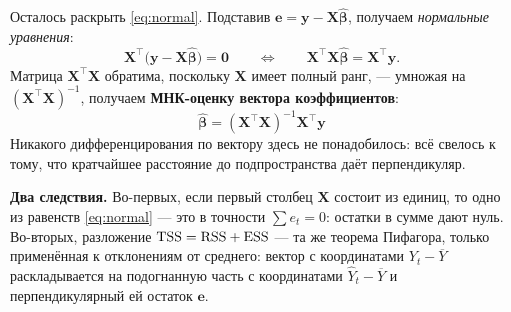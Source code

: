 Осталось раскрыть \eqref{eq:normal}. Подставив
$\mathbf{e} = \mathbf{y} - \mathbf{X}\widehat{\boldsymbol{\beta}}$, получаем
\emph{нормальные уравнения}:
\[
  \mathbf{X}^{\top}\bigl(\mathbf{y} - \mathbf{X}\widehat{\boldsymbol{\beta}}\bigr) = \mathbf{0}
  \qquad\Longleftrightarrow\qquad
  \mathbf{X}^{\top}\mathbf{X}\widehat{\boldsymbol{\beta}} = \mathbf{X}^{\top}\mathbf{y} .
\]
Матрица $\mathbf{X}^{\top}\mathbf{X}$ обратима, поскольку $\mathbf{X}$ имеет полный
ранг, — умножая на $(\mathbf{X}^{\top}\mathbf{X})^{-1}$, получаем \textbf{МНК-оценку
вектора коэффициентов}:
\begin{equation}
  \boxed{\ \widehat{\boldsymbol{\beta}} = (\mathbf{X}^{\top}\mathbf{X})^{-1}\mathbf{X}^{\top}\mathbf{y}\ }
  \label{eq:ols}
\end{equation}
Никакого дифференцирования по вектору здесь не понадобилось: всё свелось к тому,
что кратчайшее расстояние до подпространства даёт перпендикуляр.

\textbf{Два следствия.} Во-первых, если первый столбец $\mathbf{X}$ состоит из
единиц, то одно из равенств \eqref{eq:normal} — это в точности
$\sum e_t = 0$: остатки в сумме дают нуль. Во-вторых, разложение
$\mathrm{TSS} = \mathrm{RSS} + \mathrm{ESS}$ — та же теорема Пифагора, только применённая к отклонениям
от среднего: вектор с координатами $Y_t - \overline{Y}$ раскладывается на
подогнанную часть с координатами $\widehat{Y}_t - \overline{Y}$ и
перпендикулярный ей остаток $\mathbf{e}$.

